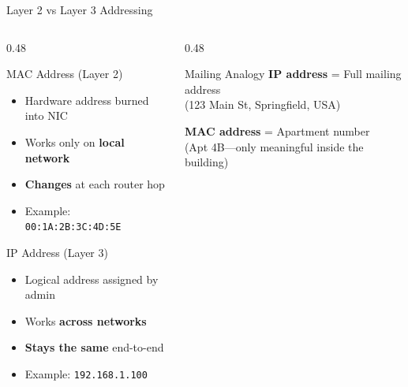 \documentclass[aspectratio=169]{beamer}  %
\begin{document}
\begin{frame}{Layer 2 vs Layer 3 Addressing}
    \begin{columns}[T]
        \begin{column}{0.48\textwidth}
            \begin{block}{MAC Address (Layer 2)}
                \begin{itemize}
                    \item Hardware address burned into NIC
                    \item Works only on \textbf{local network}
                    \item \textbf{Changes} at each router hop
                    \item Example: \texttt{00:1A:2B:3C:4D:5E}
                \end{itemize}
            \end{block}
            
            \vspace{0.3em}
            \begin{block}{IP Address (Layer 3)}
                \begin{itemize}
                    \item Logical address assigned by admin
                    \item Works \textbf{across networks}
                    \item \textbf{Stays the same} end-to-end
                    \item Example: \texttt{192.168.1.100}
                \end{itemize}
            \end{block}
        \end{column}
        \begin{column}{0.48\textwidth}
            \begin{exampleblock}{Mailing Analogy}
                \textbf{IP address} = Full mailing address \\
                (123 Main St, Springfield, USA)
                
                \vspace{0.3em}
                \textbf{MAC address} = Apartment number \\
                (Apt 4B---only meaningful inside the building)
            \end{exampleblock}
            

\end{column}
\end{columns}
\end{frame}
\end{document}
